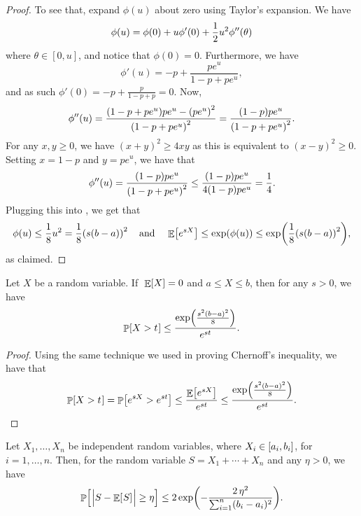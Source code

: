 \begin{proof}
    To see that, expand $\phi(u)$ about zero using Taylor's
    expansion. We have
    \begin{equation}
        \phi(u) = \phi(0)+u\phi'(0)+\frac{1}{2}u^{2}\phi''(\theta)
        \eqlab{phi:u}
    \end{equation}
    where $\theta\in [0,u]$, and notice
    that $\phi(0)=0$.
    Furthermore, we have
    \[
    \phi'(u) = -p + \frac{pe^u}{1-p + pe^u},
    \]
    and as such $\phi'(0) = -p + \frac{p}{1-p + p } = 0$.
    Now,
    \[
    \phi''(u) = \frac{\pth{ 1-p + pe^u}pe^u - \pth{pe^u}^2 }{\pth{1-p
          + pe^u}^2} = \frac{\pth{ 1-p}pe^u }{\pth{1-p + pe^u}^2}.
    \]
    For any $x, y \geq 0$, we have $(x+y)^2 \geq 4xy$ as this is
    equivalent to $(x-y)^2 \geq 0$. Setting $x = 1-p$ and $y = pe^u$,
    we have that
    \[
    \phi''(u) =
    \frac{\pth{ 1-p}pe^u }{\pth{1-p + pe^u}^2}
    \leq
    \frac{\pth{ 1-p}pe^u }{4\pth{ 1-p}pe^u} = \frac{1}{4}.
    \]
    Plugging this into , we get that
    \[
    \phi(u) \leq \frac{1}{8}u^{2} = \frac{1}{8}\pth{s(b-a)}^{2} \;\;\;
    \text{ and } \;\;\; \Ex{e^{sX}} \leq \exp \pth{ \phi(u) } \leq
    \exp\pth{ \frac{1}{8}\pth{s(b-a)}^{2}},
    \]
    as claimed.
\end{proof}

\begin{lemma}
    Let $X$ be a random variable.
    If $\;\mathop{\mathbb{E}}\!\left[ {X} \right]=0$ and $a\le X\le b$, then for any $s > 0$, we have
    \[
    \Prob{ X > t \MakesBig\ts }%
    \leq%
    \frac{\exp \pth{\frac{s^{2}(b-a)^{2}}{8}}} {e^{st}}.
    \]
\end{lemma}

\begin{proof}
    Using the same technique we used in proving Chernoff's inequality,
    we have that
    \begin{align*}
        \Prob{ X > t \MakesBig\ts } = \Prob{ e^{sX} > e^{st} }%
        \leq%
        \frac{\Ex{ e^{sX} }}{e^{st}} \leq \frac{\exp
           \pth{\frac{s^{2}(b-a)^{2}}{8}}} {e^{st}}.
    \end{align*}
\end{proof}


\begin{fragment}{}
\begin{theorem}
    Let $X_1, \dots, X_n$ be independent random variables, where $X_i
    \in \left[ {a_i, b_i} \right]$, for $i=1,\ldots, n$.  Then, for the random
    variable $ S = X_1 + \cdots + X_n$ and any $\eta > 0$, we have
    \[
        \Prob{\ts \cardin{\Bigl. S - \Ex{\ts S\MakesBig } \ts } \geq
           \eta} \leq 2\exp \pth{ - \frac{2\,\eta^2}{\sum_{i=1}^n (b_i
              - a_i)^2} }.
    \]


\end{theorem}
\end{fragment}

